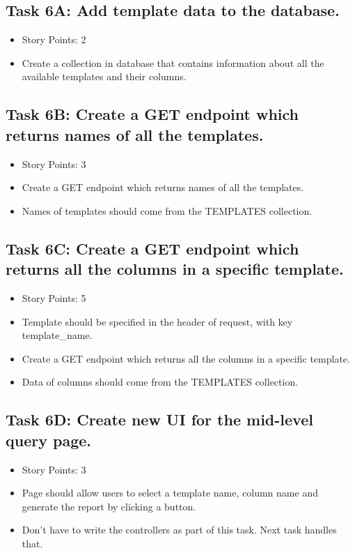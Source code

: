 \documentclass[12pt]{article}
\begin{document}
\subsection{Task 6A: Add template data to the database.}
\begin{itemize}%
\item Story Points: 2
\item Create a collection in database that contains information about all the available templates and their columns.
\end{itemize}

\subsection{Task 6B: Create a GET endpoint which returns names of all the templates.}
\begin{itemize}%
\item Story Points: 3
\item Create a  GET endpoint which returns names of all the templates.
\item Names of templates should come from the TEMPLATES collection.
\end{itemize}

\subsection{Task 6C: Create a GET endpoint which returns all the columns in a specific template.}
\begin{itemize}%
\item Story Points: 5
\item Template should be specified  in the header of request, with key template\_name.
\item Create a GET endpoint which returns all the columns in a specific template.
\item Data of columns should come from the TEMPLATES collection.
\end{itemize}

\subsection{Task 6D: Create new UI for the mid-level query page.}
\begin{itemize}%
\item Story Points: 3
\item Page should allow users to select a template name, column name and generate the report by clicking a button.
\item Don't have to write the controllers as part of this task. Next task handles that.
\end{itemize}
\end{document}
